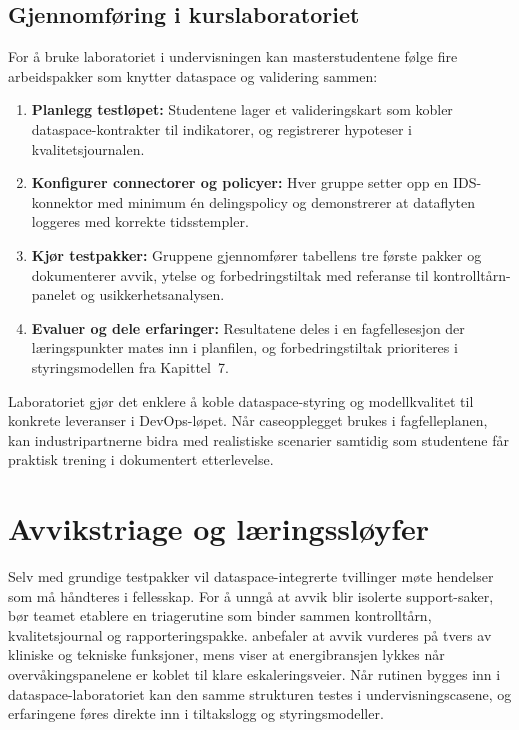 \subsection{Gjennomføring i kurslaboratoriet}
For å bruke laboratoriet i undervisningen kan masterstudentene følge fire arbeidspakker som knytter dataspace og validering sammen:
\begin{enumerate}
    \item \textbf{Planlegg testløpet:} Studentene lager et valideringskart som kobler dataspace-kontrakter til indikatorer, og registrerer hypoteser i kvalitetsjournalen.
    \item \textbf{Konfigurer connectorer og policyer:} Hver gruppe setter opp en IDS-konnektor med minimum én delingspolicy og demonstrerer at dataflyten loggeres med korrekte tidsstempler.\citep{idsa2023operational}
    \item \textbf{Kjør testpakker:} Gruppene gjennomfører tabellens tre første pakker og dokumenterer avvik, ytelse og forbedringstiltak med referanse til kontrolltårn-panelet og usikkerhetsanalysen.
    \item \textbf{Evaluer og dele erfaringer:} Resultatene deles i en fagfellesesjon der læringspunkter mates inn i planfilen, og forbedringstiltak prioriteres i styringsmodellen fra Kapittel~7.
\end{enumerate}

Laboratoriet gjør det enklere å koble dataspace-styring og modellkvalitet til konkrete leveranser i DevOps-løpet. Når caseopplegget brukes i fagfelleplanen, kan industripartnerne bidra med realistiske scenarier samtidig som studentene får praktisk trening i dokumentert etterlevelse.

\section{Avvikstriage og læringssløyfer}
Selv med grundige testpakker vil dataspace-integrerte tvillinger møte hendelser som må håndteres i fellesskap. For å unngå at avvik blir isolerte support-saker, bør teamet etablere en triagerutine som binder sammen kontrolltårn, kvalitetsjournal og rapporteringspakke. \citet{helsetilsynet2024internkontroll} anbefaler at avvik vurderes på tvers av kliniske og tekniske funksjoner, mens \citet{energinorge2023beredskap} viser at energibransjen lykkes når overvåkingspanelene er koblet til klare eskaleringsveier. Når rutinen bygges inn i dataspace-laboratoriet kan den samme strukturen testes i undervisningscasene, og erfaringene føres direkte inn i tiltakslogg og styringsmodeller.

